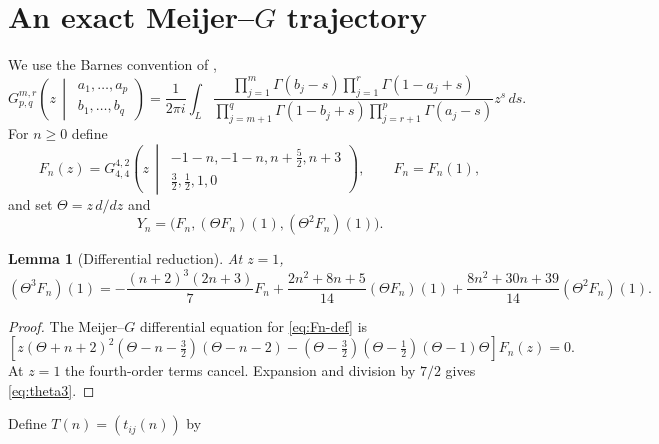 \documentclass[11pt]{article}
\newtheorem{lemma}[theorem]{Lemma}
\theoremstyle{remark}
\newcommand{\Th}{\Theta}
\begin{document}
\section{An exact Meijer--\texorpdfstring{$G$}{G} trajectory}

We use the Barnes convention of \cite[Sec.~16.17]{DLMF},
\[
G_{p,q}^{m,r}\!\left(z\,\middle|\,
 \begin{matrix}a_1,\ldots,a_p\\b_1,\ldots,b_q\end{matrix}\right)
=\frac1{2\pi i}\int_L
 \frac{\prod_{j=1}^{m}\Gamma(b_j-s)
       \prod_{j=1}^{r}\Gamma(1-a_j+s)}
      {\prod_{j=m+1}^{q}\Gamma(1-b_j+s)
       \prod_{j=r+1}^{p}\Gamma(a_j-s)}z^s\,ds.
\]
For $n\geq0$ define
\begin{equation}\label{eq:Fn-def}
 F_n(z)=G_{4,4}^{4,2}\!\left(z\,\middle|\,
 \begin{matrix}-1-n,-1-n,n+\frac52,n+3\\
 \frac32,\frac12,1,0\end{matrix}\right),
 \qquad F_n=F_n(1),
\end{equation}
and set $\Th=z\,d/dz$ and
\[
 Y_n=\bigl(F_n,(\Th F_n)(1),(\Th^2F_n)(1)\bigr).
\]

\begin{lemma}[Differential reduction]\label{lem:theta-reduction}
At $z=1$,
\begin{equation}\label{eq:theta3}
 (\Th^3F_n)(1)=
 -\frac{(n+2)^3(2n+3)}7F_n
 +\frac{2n^2+8n+5}{14}(\Th F_n)(1)
 +\frac{8n^2+30n+39}{14}(\Th^2F_n)(1).
\end{equation}
\end{lemma}

\begin{proof}
The Meijer--$G$ differential equation for \eqref{eq:Fn-def} is
\[
 \left[z(\Th+n+2)^2(\Th-n-\tfrac32)(\Th-n-2)
 -(\Th-\tfrac32)(\Th-\tfrac12)(\Th-1)\Th\right]F_n(z)=0.
\]
At $z=1$ the fourth-order terms cancel.  Expansion and division by
$7/2$ gives \eqref{eq:theta3}.
\end{proof}

Define $T(n)=(t_{ij}(n))$ by
\begin{center}
\end{center}
\end{document}
